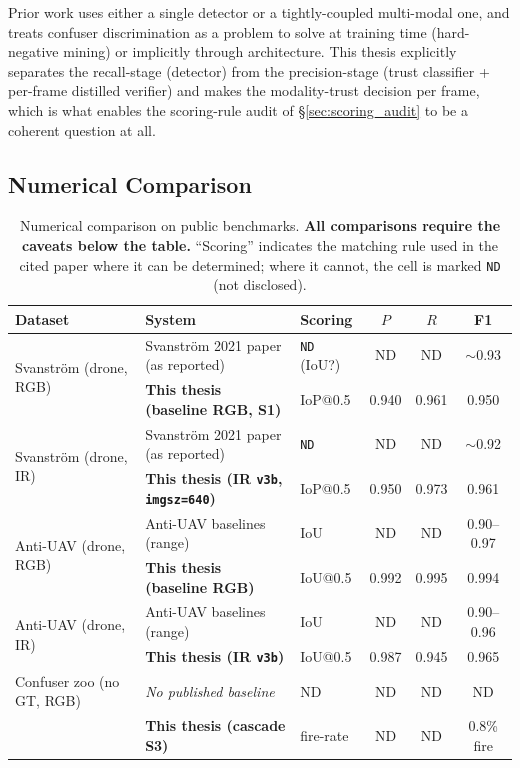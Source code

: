 \documentclass[12pt,a4paper,oneside,openright]{book}
\begin{document}
Prior work uses either a single detector or a tightly-coupled multi-modal one, and treats confuser discrimination as a problem to solve at training time (hard-negative mining) or implicitly through architecture. This thesis explicitly separates the recall-stage (detector) from the precision-stage (trust classifier + per-frame distilled verifier) and makes the modality-trust decision per frame, which is what enables the scoring-rule audit of \S\ref{sec:scoring_audit} to be a coherent question at all.

\subsection{Numerical Comparison}

\begin{table}[htbp]
    \centering
    \caption{Numerical comparison on public benchmarks. \textbf{All comparisons require the caveats below the table.} ``Scoring'' indicates the matching rule used in the cited paper where it can be determined; where it cannot, the cell is marked \texttt{ND} (not disclosed).}
    \label{tab:numerical_comparison}
    \begin{tabular}{lllccc}
        \toprule
        Dataset & System & Scoring & $P$ & $R$ & F1 \\
        \midrule
        \multirow{2}{*}{Svanstr\"om (drone, RGB)} & Svanstr\"om 2021 paper (as reported) & \texttt{ND} (IoU?) & ND & ND & $\sim$0.93 \\
                                                   & \textbf{This thesis (baseline RGB, S1)} & IoP@0.5 & 0.940 & 0.961 & 0.950 \\
        \midrule
        \multirow{2}{*}{Svanstr\"om (drone, IR)}  & Svanstr\"om 2021 paper (as reported) & \texttt{ND} & ND & ND & $\sim$0.92 \\
                                                   & \textbf{This thesis (IR \texttt{v3b}, \texttt{imgsz=640})} & IoP@0.5 & 0.950 & 0.973 & 0.961 \\
        \midrule
        \multirow{2}{*}{Anti-UAV (drone, RGB)}    & Anti-UAV baselines (range) & IoU & ND & ND & 0.90--0.97 \\
                                                   & \textbf{This thesis (baseline RGB)} & IoU@0.5 & 0.992 & 0.995 & 0.994 \\
        \midrule
        \multirow{2}{*}{Anti-UAV (drone, IR)}     & Anti-UAV baselines (range) & IoU & ND & ND & 0.90--0.96 \\
                                                   & \textbf{This thesis (IR \texttt{v3b})} & IoU@0.5 & 0.987 & 0.945 & 0.965 \\
        \midrule
        Confuser zoo (no GT, RGB)                  & \emph{No published baseline} & ND & ND & ND & ND \\
                                                   & \textbf{This thesis (cascade S3)} & fire-rate & ND & ND & 0.8\% fire \\
        \bottomrule
    \end{tabular}
\end{table}
\end{document}
